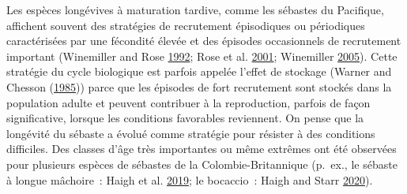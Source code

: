 \documentclass[11pt]{book}
\begin{document}
Les espèces longévives à maturation tardive, comme les sébastes du Pacifique, affichent souvent des stratégies de recrutement épisodiques ou périodiques caractérisées par une fécondité élevée et des épisodes occasionnels de recrutement important (Winemiller and Rose \protect\hyperlink{ref-winemiller1992}{1992}; Rose et al. \protect\hyperlink{ref-rose2001}{2001}; Winemiller \protect\hyperlink{ref-winemiller2005}{2005}). Cette stratégie du cycle biologique est parfois appelée l'effet de stockage (Warner and Chesson (\protect\hyperlink{ref-warner1985}{1985})) parce que les épisodes de fort recrutement sont stockés dans la population adulte et peuvent contribuer à la reproduction, parfois de façon significative, lorsque les conditions favorables reviennent. On pense que la longévité du sébaste a évolué comme stratégie pour résister à des conditions difficiles. Des classes d'âge très importantes ou même extrêmes ont été observées pour plusieurs espèces de sébastes de la Colombie-Britannique (p.~ex., le sébaste à longue mâchoire~: Haigh et al. \protect\hyperlink{ref-haigh2019}{2019}; le bocaccio~: Haigh and Starr \protect\hyperlink{ref-haigh2020}{2020}).
\end{document}
